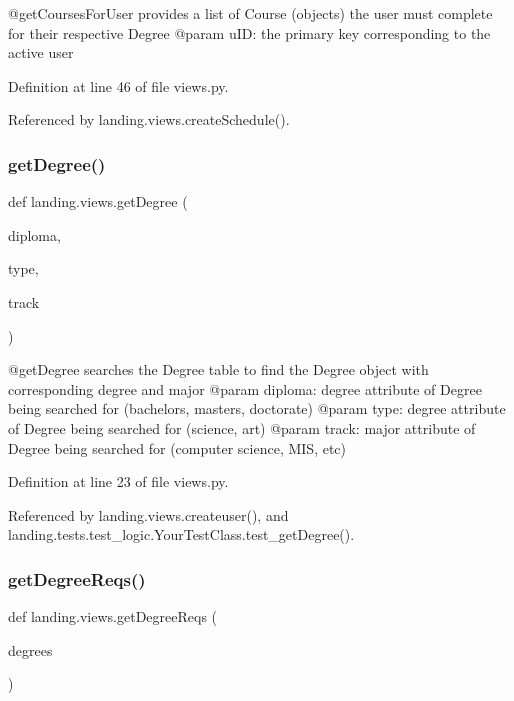 \begin{DoxyVerb}@getCoursesForUser provides a list of Course (objects) the user must complete for their respective Degree
@param uID: the primary key corresponding to the active user
\end{DoxyVerb}
 

Definition at line 46 of file views.\+py.



Referenced by landing.\+views.\+create\+Schedule().

\mbox{\label{namespacelanding_1_1views_a58f59d9cfdce67b9f2c7f59d99e39e4e}} 
\subsubsection{\texorpdfstring{get\+Degree()}{getDegree()}}
{\footnotesize\ttfamily def landing.\+views.\+get\+Degree (\begin{DoxyParamCaption}\item[{}]{diploma,  }\item[{}]{type,  }\item[{}]{track }\end{DoxyParamCaption})}

\begin{DoxyVerb}@getDegree searches the Degree table to find the Degree object with corresponding degree and major
@param diploma: degree attribute of Degree being searched for (bachelors, masters, doctorate)
@param type: degree attribute of Degree being searched for (science, art)
@param track: major attribute of Degree being searched for (computer science, MIS, etc)
\end{DoxyVerb}
 

Definition at line 23 of file views.\+py.



Referenced by landing.\+views.\+createuser(), and landing.\+tests.\+test\+\_\+logic.\+Your\+Test\+Class.\+test\+\_\+get\+Degree().

\mbox{\label{namespacelanding_1_1views_adf4b5d99c41ac39f87a359bdd86b2b02}} 
\subsubsection{\texorpdfstring{get\+Degree\+Reqs()}{getDegreeReqs()}}
{\footnotesize\ttfamily def landing.\+views.\+get\+Degree\+Reqs (\begin{DoxyParamCaption}\item[{}]{degrees }\end{DoxyParamCaption})}

